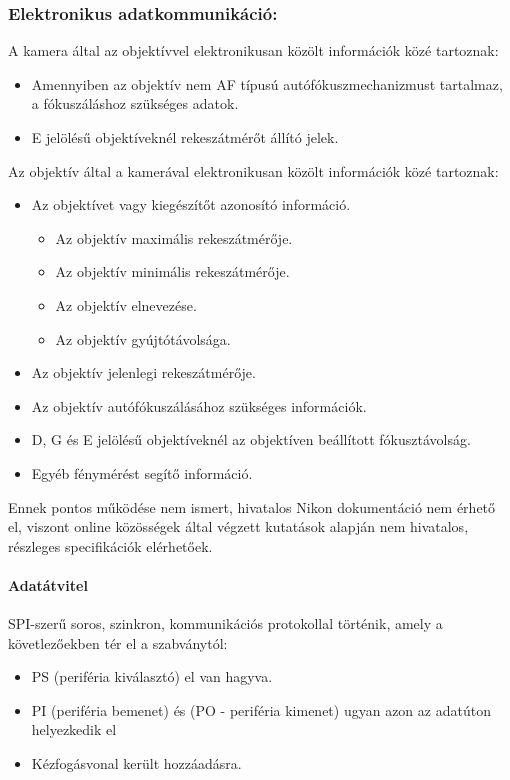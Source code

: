 \subsubsection{Elektronikus adatkommunikáció:}
A kamera által az objektívvel elektronikusan közölt információk közé tartoznak:
\begin{itemize}
    \item Amennyiben az objektív nem AF típusú autófókuszmechanizmust tartalmaz, a fókuszáláshoz szükséges adatok.
    \item E jelölésű objektíveknél rekeszátmérőt állító jelek.
\end{itemize}
Az objektív által a kamerával elektronikusan közölt információk közé tartoznak:
\begin{itemize}
    \item Az objektívet vagy kiegészítőt azonosító információ.
    \begin{itemize}
        \item Az objektív maximális rekeszátmérője.
        \item Az objektív minimális rekeszátmérője.
        \item Az objektív elnevezése.
        \item Az objektív gyújtótávolsága.%
    \end{itemize}
    \item Az objektív jelenlegi rekeszátmérője.
    \item Az objektív autófókuszálásához szükséges információk.
    \item D, G és E jelölésű objektíveknél az objektíven beállított fókusztávolság.
    \item Egyéb fénymérést segítő információ.
\end{itemize}

Ennek pontos működése nem ismert, hivatalos Nikon dokumentáció nem érhető el, viszont online közösségek által végzett kutatások alapján nem hivatalos, részleges specifikációk elérhetőek.
\paragraph{Adatátvitel}
SPI-szerű soros, szinkron, kommunikációs protokollal történik, amely a követlezőekben tér el a szabványtól:
\begin{itemize}
    \item PS (periféria kiválasztó) el van hagyva.
    \item PI (periféria bemenet) és (PO - periféria kimenet) ugyan azon az adatúton helyezkedik el
    \item Kézfogásvonal került hozzáadásra.
\end{itemize}

